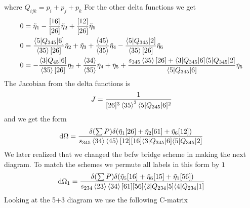 \documentclass[a4paper,12pt]{article}
\newcommand{\aMs}[3]{\langle #1|#2|#3]}  		%
\begin{document}
where $Q_{ijk}=p_i+p_j+p_k$
For the other delta functions we get
\begin{equation}
	\begin{aligned}
	 0&=\tilde\eta_1-\frac{[16]}{[26]}\tilde\eta_2+\frac{[12]}{[26]}\tilde\eta_6\\
		0&= \frac{\langle5|Q_{345}|6]}{\expval{35}[26]}\tilde\eta_2+\tilde\eta_3+\frac{\expval{45}}{\expval{35}}\tilde\eta_4-\frac{\langle5|Q_{345}|2]}{\expval{35}[26]}\tilde\eta_6
		\\
		0&= -\frac{\langle3|Q_{45}|6]}{\expval{35}[26]}\tilde\eta_2+\frac{\expval{34}}{\expval{35}}\tilde\eta_4+\tilde\eta_5+\frac{s_{345}\expval{35}[26]+\langle3|Q_{345}|6]\langle5|Q_{345}|2] }{\langle5|Q_{345}|6]}
\tilde\eta_5
	\end{aligned}
\end{equation}
The Jacobian from the delta functions is
\begin{equation}
	\begin{aligned}
		J=\frac{1}{[26]^3\expval{35}^3\aMs{5}{Q_{345}}{6}^2}
	\end{aligned}
\end{equation}
and we get the form
\begin{equation}
	\begin{aligned}
		\dd \Omega=\frac{\delta(\sum P)\delta(\tilde\eta_1[26]+\tilde\eta_2[61]+\tilde\eta_6[12])}{s_{345}\expval{34}\expval{45}[12][16]\aMs{3}{Q_{345}}{6}\aMs{5}{Q_{345}}{2}}
	\end{aligned}
\end{equation}
We later realized that we changed the bcfw bridge scheme in making the next diagram. To match the schemes we permute all labels in this form by $1$
\begin{equation}
	\begin{aligned}
		\dd \Omega_1=\frac{\delta(\sum P)\delta(\tilde\eta_5[16]+\tilde\eta_6[15]+\tilde\eta_1[56])}{s_{234}\expval{23}\expval{34}[61][56]\aMs{2}{Q_{234}}{5}\aMs{4}{Q_{234}}{1}}
	\end{aligned}
\end{equation}
Looking at the 5+3 diagram we use the following C-matrix
\end{document}
